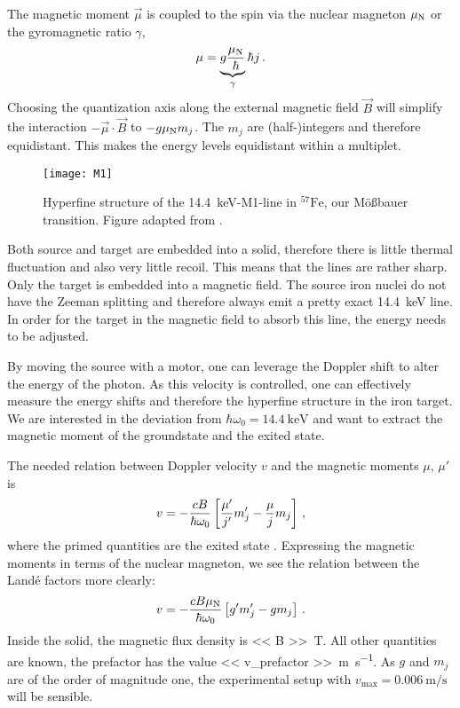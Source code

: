 \documentclass[11pt, english, fleqn, DIV=15, headinclude, BCOR=2cm]{scrreprt}
\begin{document}
The magnetic moment $\vec \mu$ is coupled to the spin via the nuclear magneton
$\mu_\text N$ or the gyromagnetic ratio $\gamma$,
\[
    \mu = \underbrace{g \frac{\mu_\text N}{\hbar}}_{\gamma} \hbar j \,.
\]
Choosing the quantization axis along the external magnetic field $\vec B$ will
simplify the interaction $- \vec \mu \cdot \vec B$ to $- g \mu_\text N m_j$.
The $m_j$ are (half-)integers and therefore equidistant. This makes the energy
levels equidistant within a multiplet.

\begin{figure}
    \centering
    \texttt{[image: M1]}
    \caption{%
        Hyperfine structure of the \SI{14.4}{\kilo\electronvolt}-M1-line in
        $^{57}\mathrm{Fe}$, our Mößbauer transition.
        Figure adapted from
        \textcite[Fig.~4.22]{Schatz/Nukleare_Festkoerperphysik}.
    }
    \label{fig:M1}
\end{figure}

Both source and target are embedded into a solid, therefore there is
little thermal fluctuation and also very little recoil. This means that the
lines are rather sharp. Only the target is embedded into a magnetic field. The
source iron nuclei do not have the Zeeman splitting and therefore always emit a
pretty exact \SI{14.4}{\kilo\electronvolt} line. In order for the target in the
magnetic field to absorb this line, the energy needs to be adjusted.

By moving the source with a motor, one can leverage the Doppler shift to alter
the energy of the photon. As this velocity is controlled, one can effectively
measure the energy shifts and therefore the hyperfine structure in the iron
target. We are interested in the deviation from $\hbar \omega_0 =
\SI{14.4}{\kilo\electronvolt}$ and want to extract the magnetic moment of the
groundstate and the exited state.

The needed relation between Doppler velocity $v$ and the magnetic moments
$\mu$, $\mu'$ is
\[
    v = - \frac{c B}{\hbar \omega_0}
    \left[ \frac{\mu'}{j'} m_j' - \frac{\mu}{j} m_j \right]
    \,,
\]
where the primed quantities are the exited state
\parencite[(4.42)]{Schatz/Nukleare_Festkoerperphysik}. Expressing the magnetic
moments in terms of the nuclear magneton, we see the relation between the Landé
factors more clearly:
\begin{equation}
    \label{eq:velocity}
    v = - \frac{c B \mu_\text N}{\hbar \omega_0} \left[ g' m_j' - g m_j \right] \,.
\end{equation}
Inside the solid, the magnetic flux density is \SI{<< B >>}{\tesla}. All other
quantities are known,
the prefactor has the value \SI{<< v_prefactor >>}{\meter\per\second}. As $g$
and $m_j$ are of the order of magnitude one, the experimental setup with
$v_\text{max} = \SI{0.006}{\meter\per\second}$ will be sensible.
\end{document}

